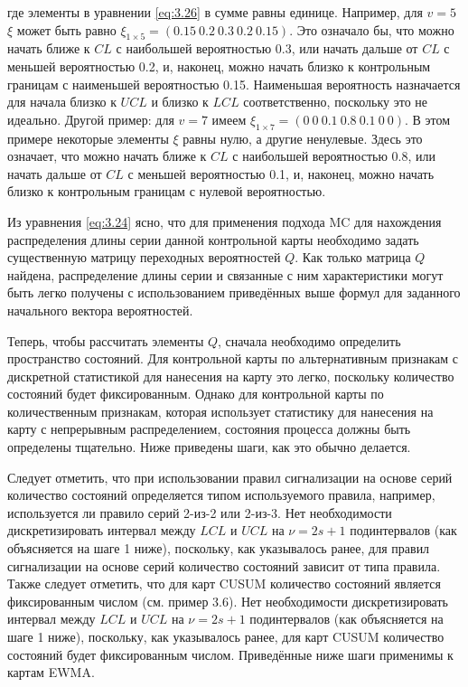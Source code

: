 где элементы в уравнении \eqref{eq:3.26} в сумме равны единице. Например, для \(v = 5\) \(\xi\) может быть равно \(\xi_{1 \times 5} = (0.15 \ 0.2 \ 0.3 \ 0.2 \ 0.15)\). Это означало бы, что можно начать ближе к \(CL\) с наибольшей вероятностью 0.3, или начать дальше от \(CL\) с меньшей вероятностью 0.2, и, наконец, можно начать близко к контрольным границам с наименьшей вероятностью 0.15. Наименьшая вероятность назначается для начала близко к \(UCL\) и близко к \(LCL\) соответственно, поскольку это не идеально. Другой пример: для \(v = 7\) имеем \(\xi_{1 \times 7} = (0 \ 0 \ 0.1 \ 0.8 \ 0.1 \ 0 \ 0)\). В этом примере некоторые элементы \(\xi\) равны нулю, а другие ненулевые. Здесь это означает, что можно начать ближе к \(CL\) с наибольшей вероятностью 0.8, или начать дальше от \(CL\) с меньшей вероятностью 0.1, и, наконец, можно начать близко к контрольным границам с нулевой вероятностью.

Из уравнения \eqref{eq:3.24} ясно, что для применения подхода MC для нахождения распределения длины серии данной контрольной карты необходимо задать существенную матрицу переходных вероятностей \(Q\). Как только матрица \(Q\) найдена, распределение длины серии и связанные с ним характеристики могут быть легко получены с использованием приведённых выше формул для заданного начального вектора вероятностей.

Теперь, чтобы рассчитать элементы \(Q\), сначала необходимо определить пространство состояний. Для контрольной карты по альтернативным признакам с дискретной статистикой для нанесения на карту это легко, поскольку количество состояний будет фиксированным. Однако для контрольной карты по количественным признакам, которая использует статистику для нанесения на карту с непрерывным распределением, состояния процесса должны быть определены тщательно. Ниже приведены шаги, как это обычно делается.

Следует отметить, что при использовании правил сигнализации на основе серий количество состояний определяется типом используемого правила, например, используется ли правило серий 2-из-2 или 2-из-3. Нет необходимости дискретизировать интервал между \(LCL\) и \(UCL\) на \(\nu = 2s + 1\) подинтервалов (как объясняется на шаге 1 ниже), поскольку, как указывалось ранее, для правил сигнализации на основе серий количество состояний зависит от типа правила. Также следует отметить, что для карт CUSUM количество состояний является фиксированным числом (см. пример 3.6). Нет необходимости дискретизировать интервал между \(LCL\) и \(UCL\) на \(\nu = 2s + 1\) подинтервалов (как объясняется на шаге 1 ниже), поскольку, как указывалось ранее, для карт CUSUM количество состояний будет фиксированным числом. Приведённые ниже шаги применимы к картам EWMA.

